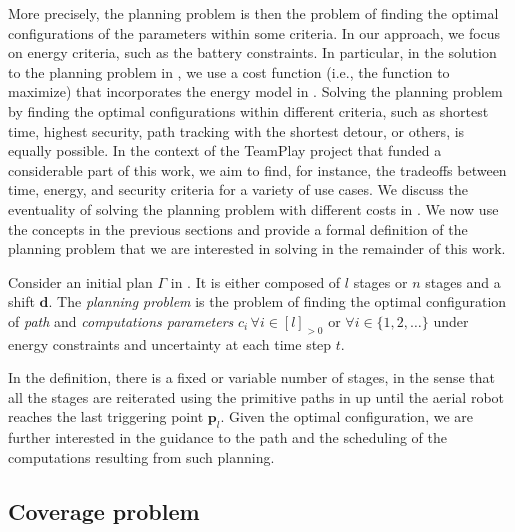 More precisely, the planning problem is then the problem of finding the optimal configurations of the parameters within some criteria. In our approach, we focus on energy criteria, such as the battery constraints. In particular, in the solution to the planning problem in , we use a cost function (i.e., the function to maximize) that incorporates the energy model in . Solving the planning problem by finding the optimal configurations within different criteria, such as shortest time, highest security, path tracking with the shortest detour, or others, is equally possible. In the context of the TeamPlay project that funded a considerable part of this work, we aim to find, for instance, the tradeoffs between time, energy, and security criteria for a variety of use cases. We discuss the eventuality of solving the planning problem with different costs in . We now use the concepts in the previous sections and provide a formal definition of the planning problem that we are interested in solving in the remainder of this work.

\begin{pb}
  \label{pb}
  Consider an initial plan $\Gamma$ in . It is either composed of $l$ stages or $n$ stages and a shift $\mathbf{d}$. The \emph{planning problem} is the problem of finding the optimal configuration of \emph{path} and \emph{computations parameters} $c_i\,\forall i\in[l]_{>0}$ or $\forall i\in\{1,2,\dots\}$ under energy constraints and uncertainty at each time step $t$.
\end{pb}    

In the definition, there is a fixed or variable number of stages, in the sense that all the stages are reiterated using the primitive paths in  up until the aerial robot reaches the last triggering point $\mathbf{p}_l$. Given the optimal configuration, we are further interested in the guidance to the path and the scheduling of the computations resulting from such planning.

\subsection{Coverage problem}


